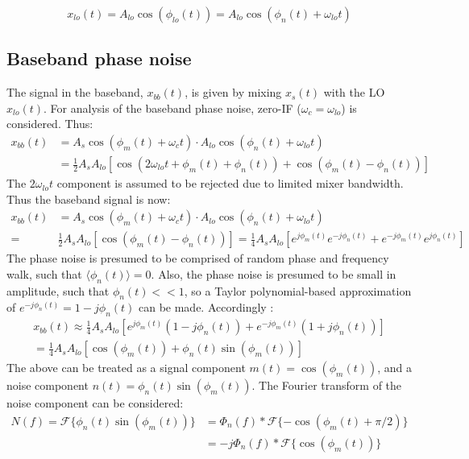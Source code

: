 		\begin{equation}
			x_{lo}(t)  = A_{lo}\cos(\phi_{lo}(t)) = A_{lo}\cos(\phi_n(t)+\omega_{lo}t)
		\end{equation} 

	\subsection{Baseband phase noise}
		The signal in the baseband, $x_{bb}(t)$, is given by mixing $x_{s}(t)$ with the LO $x_{lo}(t)$. For analysis of the baseband phase noise, zero-IF ($\omega_{c}=\omega_{lo}$) is considered. Thus:
		\begin{align}
			x_{bb}(t) & = A_s\cos(\phi_m(t)+\omega_ct)\cdot A_{lo}\cos(\phi_n(t)+\omega_{lo}t) \\
			& = \frac{1}{2}A_sA_{lo}\left[\cos(2\omega_{lo}t + \phi_m(t) + \phi_n(t)) +  \cos(\phi_m(t) - \phi_n(t))\right] 
		\end{align} 
		The $2\omega_{lo}t$ component is assumed to be rejected due to limited mixer bandwidth. Thus the baseband signal is now:
		\begin{align}
			x_{bb}(t) &= A_s\cos(\phi_m(t)+\omega_ct)\cdot A_{lo}\cos(\phi_n(t)+\omega_{lo}t)\\
			= & \frac{1}{2}A_sA_{lo}\left[\cos(\phi_m(t) - \phi_n(t))\right] = \frac{1}{4}A_sA_{lo}\left[e^{j\phi_m(t)} e^{-j\phi_n(t)} + e^{-j\phi_m(t)} e^{j\phi_n(t)}\right] 
		\end{align} 
		The phase noise is presumed to be comprised of random phase and frequency walk, such that $\langle\phi_n(t)\rangle = 0$. Also, the phase noise is presumed to be small in amplitude, such that $\phi_n(t) << 1$, so a Taylor polynomial-based approximation of $e^{-j\phi_n(t)} = 1 -j\phi_n(t)$ can be made. Accordingly :
		\begin{align}
			x_{bb}(t) \approx \frac{1}{4}A_sA_{lo}\left[e^{j\phi_m(t)}(1 -j\phi_n(t))+ e^{-j\phi_m(t)}(1+j\phi_n(t))\right] \\
			= \frac{1}{4}A_sA_{lo}\left[\cos(\phi_m(t)) + \phi_n(t)\sin(\phi_m(t))\right]
		\end{align} 
		The above can be treated as a signal component $m(t) = \cos(\phi_m(t))$, and a noise component $n(t) = \phi_n(t)\sin(\phi_m(t))$. The Fourier transform of the noise component can be considered:
		\begin{align}
			N(f) = \mathcal{F}\{\phi_n(t)\sin(\phi_m(t))\} &= \Phi_n(f)*\mathcal{F}\{-\cos(\phi_m(t)+\pi/2)\}\\
			& =-j\Phi_n(f)*\mathcal{F}\{\cos(\phi_m(t))\}
		\end{align}

